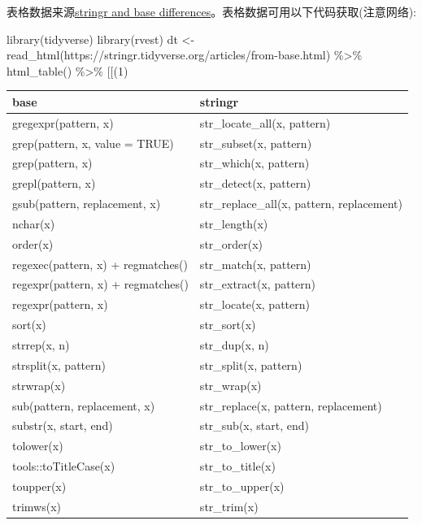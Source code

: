 \documentclass[
]{book}
\newenvironment{Shaded}{\begin{snugshade}}{\end{snugshade}}
\newcommand{\AttributeTok}[1]{\textcolor[rgb]{0.77,0.63,0.00}{#1}}
\newcommand{\DecValTok}[1]{\textcolor[rgb]{0.00,0.00,0.81}{#1}}
\newcommand{\FunctionTok}[1]{\textcolor[rgb]{0.00,0.00,0.00}{#1}}
\newcommand{\NormalTok}[1]{#1}
\newcommand{\OtherTok}[1]{\textcolor[rgb]{0.56,0.35,0.01}{#1}}
\newcommand{\SpecialCharTok}[1]{\textcolor[rgb]{0.00,0.00,0.00}{#1}}
\newcommand{\StringTok}[1]{\textcolor[rgb]{0.31,0.60,0.02}{#1}}
\begin{document}
表格数据来源\href{https://stringr.tidyverse.org/articles/from-base.html}{stringr and base differences}。表格数据可用以下代码获取(注意网络):

\begin{Shaded}
\begin{Highlighting}[]
\FunctionTok{library}\NormalTok{(tidyverse)}
\FunctionTok{library}\NormalTok{(rvest)}
\NormalTok{dt }\OtherTok{\textless{}{-}} \FunctionTok{read\_html}\NormalTok{(}\StringTok{\textquotesingle{}https://stringr.tidyverse.org/articles/from{-}base.html\textquotesingle{}}\NormalTok{) }\SpecialCharTok{\%\textgreater{}\%} 
   \FunctionTok{html\_table}\NormalTok{() }\SpecialCharTok{\%\textgreater{}\%} \StringTok{\textasciigrave{}}\AttributeTok{[[}\StringTok{\textasciigrave{}}\NormalTok{(}\DecValTok{1}\NormalTok{)}
\end{Highlighting}
\end{Shaded}

\begin{longtable}[]{@{}ll@{}}
\toprule
base & stringr \\
\midrule
\endhead
gregexpr(pattern, x) & str\_locate\_all(x, pattern) \\
grep(pattern, x, value = TRUE) & str\_subset(x, pattern) \\
grep(pattern, x) & str\_which(x, pattern) \\
grepl(pattern, x) & str\_detect(x, pattern) \\
gsub(pattern, replacement, x) & str\_replace\_all(x, pattern, replacement) \\
nchar(x) & str\_length(x) \\
order(x) & str\_order(x) \\
regexec(pattern, x) + regmatches() & str\_match(x, pattern) \\
regexpr(pattern, x) + regmatches() & str\_extract(x, pattern) \\
regexpr(pattern, x) & str\_locate(x, pattern) \\
sort(x) & str\_sort(x) \\
strrep(x, n) & str\_dup(x, n) \\
strsplit(x, pattern) & str\_split(x, pattern) \\
strwrap(x) & str\_wrap(x) \\
sub(pattern, replacement, x) & str\_replace(x, pattern, replacement) \\
substr(x, start, end) & str\_sub(x, start, end) \\
tolower(x) & str\_to\_lower(x) \\
tools::toTitleCase(x) & str\_to\_title(x) \\
toupper(x) & str\_to\_upper(x) \\
trimws(x) & str\_trim(x) \\
\bottomrule
\end{longtable}
\end{document}
